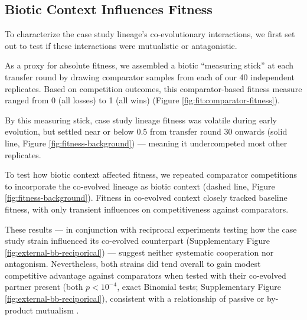\subsection{Biotic Context Influences Fitness}
\label{sec:biotic-context-influences-fitness}



To characterize the case study lineage's co-evolutionary interactions, we first set out to test if these interactions were mutualistic or antagonistic.

As a proxy for absolute fitness, we assembled a biotic ``measuring stick'' at each transfer round by drawing comparator samples from each of our 40 independent replicates.
Based on competition outcomes, this comparator-based fitness measure ranged from 0 (all losses) to 1 (all wins) (Figure \ref{fig:fit:comparator-fitness}).

By this measuring stick, case study lineage fitness was volatile during early evolution, but settled near or below 0.5 from transfer round 30 onwards (solid line, Figure \ref{fig:fitness-background}) --- meaning it undercompeted most other replicates.

To test how biotic context affected fitness, we repeated comparator competitions to incorporate the co-evolved lineage as biotic context (dashed line, Figure \ref{fig:fitness-background}).
Fitness in co-evolved context closely tracked baseline fitness, with only transient influences on competitiveness against comparators.

These results --- in conjunction with reciprocal experiments testing how the case study strain influenced its co-evolved counterpart (Supplementary Figure \ref{fig:external-bb-reciporical}) --- suggest neither systematic cooperation nor antagonism.
Nevertheless, both strains did tend overall to gain modest competitive advantage against comparators when tested with their co-evolved partner present (both $p < 10^{-4}$, exact Binomial tests; Supplementary Figure \ref{fig:external-bb-reciporical}), consistent with a relationship of passive or by-product mutualism \citep{marchal2017passive,connor1995benefits}.

